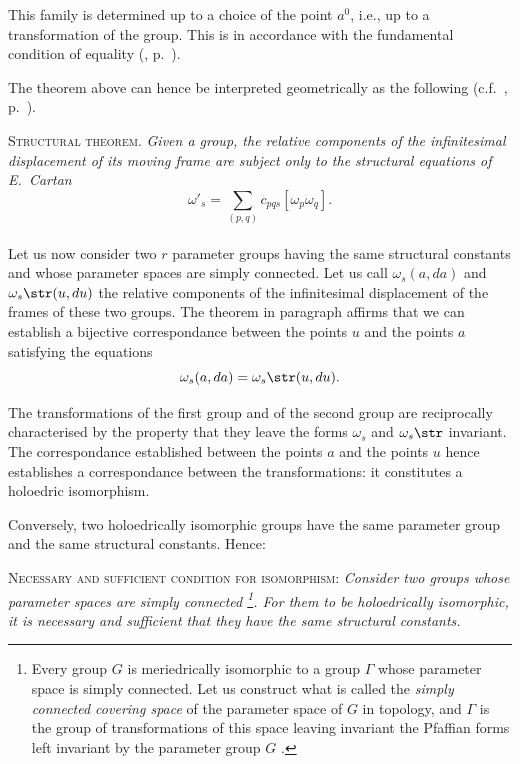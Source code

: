 This family is determined up to a choice of the point $a^{0}$, i.e., up to a transformation of the group. This is in accordance with the fundamental condition of equality (, p.~\pageref{sec:76}).

The theorem above can hence be interpreted geometrically as the following (c.f.~, p.~\pageref{sec:77}).

\somespace

\textsc{Structural theorem}. \emph{Given a group, the relative components of the infinitesimal displacement of its moving frame are subject only to the structural equations of E.~Cartan}
\[
\omega'_{s}=\sum_{(p,q)}c_{pqs}[\omega_{p}\omega_{q}].
\]


\paragraph{}
\label{sec:164}
Let us now consider two $r$ parameter groups having the same structural constants and whose parameter spaces are simply connected. Let us call $\omega_{s}(a,da)$ and $\omega_{s}\str(u,du)$ the relative components of the infinitesimal displacement of the frames of these two groups. The theorem in paragraph  affirms that we can establish a bijective correspondance between the points $u$ and the points $a$ satisfying the equations
\[
\omega_{s}(a,da)=\omega_{s}\str(u,du).
\]

The transformations of the first group and of the second group are reciprocally characterised by the property that they leave the forms $\omega_{s}$ and $\omega_{s}\str$ invariant. The correspondance established between the points $a$ and the points $u$ hence establishes a correspondance between the transformations: it constitutes a holoedric isomorphism.

Conversely, two holoedrically isomorphic groups have the same parameter group and the same structural constants. Hence:

\somespace

\textsc{Necessary and sufficient condition for isomorphism:} \emph{Consider two groups whose parameter spaces are simply connected \footnote{Every group $G$ is meriedrically isomorphic to a group $\Gamma$ whose parameter space is simply connected. Let us construct what is called the \emph{simply connected covering space} of the parameter space of $G$ in topology, and $\Gamma$ is the group of transformations of this space leaving invariant the Pfaffian forms left invariant by the parameter group $G$ \cite{15}.}. For them to be holoedrically isomorphic, it is necessary and sufficient that they have the same structural constants.}

